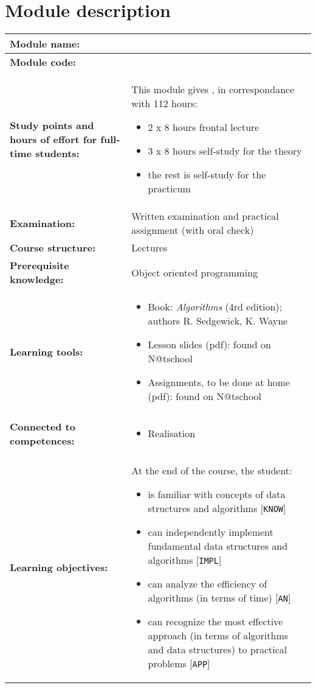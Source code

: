 \section*{Module description}
\begin{tabularx}{\textwidth}{|>{\columncolor{lichtGrijs}} p{}|X|}
	\hline
	\textbf{Module name:} & \modulenaam\\
	\hline
	\textbf{Module code: }& \modulecode\\
	\hline
	\textbf{Study points \newline and hours of effort for full-time students:} & This module gives \stdPunten, in correspondance with 112 hours:
	\begin{itemize}
		\item 2 x 8 hours frontal lecture
		\item 3 x 8 hours self-study for the theory
		\item the rest is self-study for the practicum
	\end{itemize} \\
	\hline
	\textbf{Examination:} & Written examination and practical assignment (with oral check) \\
	\hline
	\textbf{Course structure:} & Lectures \\
	\hline
	\textbf{Prerequisite knowledge:} & Object oriented programming \\
	\hline
	\textbf{Learning tools:} & \begin{itemize}
			\item Book: \textit{Algorithms} (4rd edition); authors R. Sedgewick, K. Wayne
			\item Lesson slides (pdf): found on N@tschool
			\item Assignments, to be done at home (pdf): found on N@tschool
		\end{itemize} \\
	\hline
	\textbf{Connected to \newline competences:} & \begin{itemize}
			\item Realisation
		\end{itemize} \\
	\hline
	\textbf{Learning objectives:} &
		At the end of the course, the student:
			\begin{itemize}
				\item is familiar with concepts of data structures and algorithms [\texttt{KNOW}]
				\item can independently implement fundamental data structures and algorithms [\texttt{IMPL}]
				\item can analyze the efficiency of algorithms (in terms of time) [\texttt{AN}]
				\item can recognize the most effective approach (in terms of algorithms and data structures) to practical problems [\texttt{APP}]
			\end{itemize} \\
		
	\hline
\end{tabularx}
\newpage

